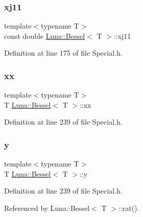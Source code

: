 \mbox{\label{structLuna_1_1Bessel_a7120d0fce9cdd7c7f650fb113d56a2ee}} 
\subsubsection{\texorpdfstring{xj11}{xj11}}
{\footnotesize\ttfamily template$<$typename T$>$ \\
const double \hyperlink{structLuna_1_1Bessel}{Luna\+::\+Bessel}$<$ T $>$\+::xj11}



Definition at line 175 of file Special.\+h.

\mbox{\label{structLuna_1_1Bessel_a15736ca5396b6f1b87895da22654d522}} 
\subsubsection{\texorpdfstring{xx}{xx}}
{\footnotesize\ttfamily template$<$typename T$>$ \\
T \hyperlink{structLuna_1_1Bessel}{Luna\+::\+Bessel}$<$ T $>$\+::xx}



Definition at line 239 of file Special.\+h.

\mbox{\label{structLuna_1_1Bessel_ab054d5c26284b7736633c171cd2717fc}} 
\subsubsection{\texorpdfstring{y}{y}}
{\footnotesize\ttfamily template$<$typename T$>$ \\
T \hyperlink{structLuna_1_1Bessel}{Luna\+::\+Bessel}$<$ T $>$\+::y}



Definition at line 239 of file Special.\+h.



Referenced by Luna\+::\+Bessel$<$ T $>$\+::rat().

\mbox{\label{structLuna_1_1Bessel_aae034512aa17e9a7541b9df1eab88627}} 
